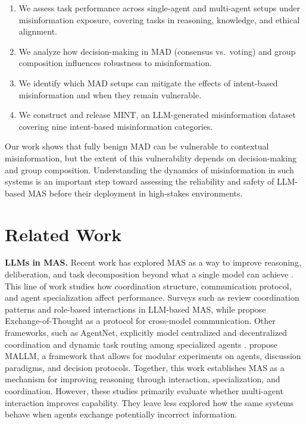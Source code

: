 \documentclass[11pt]{article}
\begin{document}
\begin{enumerate}
    \setlength{\itemsep}{4pt}
    \setlength{\parskip}{0pt}
    \setlength{\parsep}{0pt}
    \item We assess task performance across single-agent and multi-agent setups under misinformation exposure, covering tasks in reasoning, knowledge, and ethical alignment.
    \item We analyze how decision-making in MAD (consensus vs.\ voting) and group composition influences robustness to misinformation.
    \item We identify which MAD setups can mitigate the effects of intent-based misinformation and when they remain vulnerable.
    \item We construct and release MINT, an LLM-generated misinformation dataset covering nine intent-based misinformation categories.
\end{enumerate}
Our work shows that fully benign MAD can be vulnerable to contextual misinformation, but the extent of this vulnerability depends on decision-making and group composition.
Understanding the dynamics of misinformation in such systems is an important step toward assessing the reliability and safety of LLM-based MAS before their deployment in high-stakes environments.


\section{Related Work}

\textbf{LLMs in MAS.}
Recent work has explored MAS as a way to improve reasoning, deliberation, and task decomposition beyond what a single model can achieve \citep{wang-etal-2024-rethinking-bounds, 10.5555/3692070.3692537, borghoff2025organizational}. 
This line of work studies how coordination structure, communication protocol, and agent specialization affect performance. 
Surveys such as \citet{TranDNP25} review coordination patterns and role-based interactions in LLM-based MAS, while \citet{yin2023exchange} propose Exchange-of-Thought as a protocol for cross-model communication. 
Other frameworks, such as AgentNet, explicitly model centralized and decentralized coordination and dynamic task routing among specialized agents \citep{YangCSS25}.
\citet{becker-etal-2025-mallm} propose MALLM, a framework that allows for modular experiments on agents, discussion paradigms, and decision protocols.
Together, this work establishes MAS as a mechanism for improving reasoning through interaction, specialization, and coordination. 
However, these studies primarily evaluate whether multi-agent interaction improves capability. 
They leave less explored how the same systems behave when agents exchange potentially incorrect information.
\end{document}
